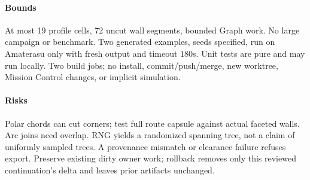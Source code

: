 \documentclass{article}
\begin{document}
\paragraph{Bounds} At most 19 profile cells, 72 uncut wall segments, bounded
Graph work. No large campaign or benchmark. Two generated examples, seeds
specified, run on Amaterasu only with fresh output and timeout 180s. Unit tests
are pure and may run locally. Two build jobs; no install, commit/push/merge,
new worktree, Mission Control changes, or implicit simulation.

\paragraph{Risks} Polar chords can cut corners; test full route capsule against
actual faceted walls. Arc joins need overlap. RNG yields a randomized spanning
tree, not a claim of uniformly sampled trees. A provenance mismatch or clearance
failure refuses export. Preserve existing dirty owner work; rollback removes
only this reviewed continuation's delta and leaves prior artifacts unchanged.

\end{document}
